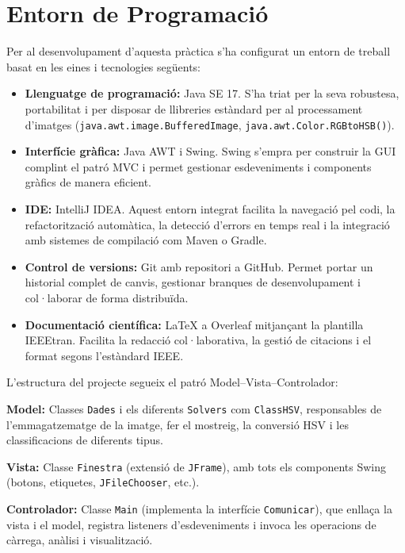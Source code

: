 \documentclass{ieeetj}
\begin{document}
\section{Entorn de Programació}
Per al desenvolupament d’aquesta pràctica s’ha configurat un entorn de treball basat en les eines i tecnologies següents:

\begin{itemize}
  \item \textbf{Llenguatge de programació:} Java SE 17. S’ha triat per la seva robustesa, portabilitat i per disposar de llibreries estàndard per al processament d’imatges (\texttt{java.awt.image.BufferedImage}, \texttt{java.awt.Color.RGBtoHSB()})\cite{smith1978}.
  \item \textbf{Interfície gràfica:} Java AWT i Swing. Swing s’empra per construir la GUI complint el patró MVC\cite{gamma1994} i permet gestionar esdeveniments i components gràfics de manera eficient\cite{gafter1999}.
  \item \textbf{IDE:} IntelliJ IDEA. Aquest entorn integrat facilita la navegació pel codi, la refactorització automàtica, la detecció d’errors en temps real i la integració amb sistemes de compilació com Maven o Gradle.
  \item \textbf{Control de versions:} Git amb repositori a GitHub. Permet portar un historial complet de canvis, gestionar branques de desenvolupament i col·laborar de forma distribuïda.
  \item \textbf{Documentació científica:} LaTeX a Overleaf mitjançant la plantilla IEEEtran. Facilita la redacció col·laborativa, la gestió de citacions i el format segons l’estàndard IEEE.
\end{itemize}

\noindent
L’estructura del projecte segueix el patró Model–Vista–Controlador:
\begin{description}
  \item\textbf{Model:} Classes \texttt{Dades} i els diferents \texttt{Solvers} com \texttt{ClassHSV}, responsables de l’emmagatzematge de la imatge, fer el mostreig, la conversió HSV i les classificacions de diferents tipus.
  
  \item\textbf{Vista:} Classe \texttt{Finestra} (extensió de \texttt{JFrame}), amb tots els components Swing (botons, etiquetes, \texttt{JFileChooser}, etc.).
  \item\textbf{Controlador:} Classe \texttt{Main} (implementa la interfície \texttt{Comunicar}), que enllaça la vista i el model, registra listeners d’esdeveniments i invoca les operacions de càrrega, anàlisi i visualització.
\end{description}
\end{document}
